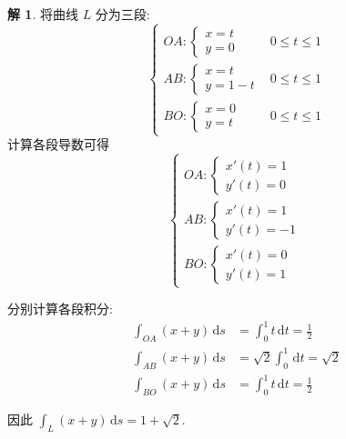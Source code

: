 \documentclass[a4paper,12pt]{article}
\theoremstyle{definition}
\newtheorem*{sol}{解}
\begin{document}
\begin{sol}
    将曲线 $L$ 分为三段:
    $$
        \begin{cases}
            OA: \begin{cases}
                    x = t \\
                    y = 0
                \end{cases} & 0 \leq t \leq 1 \\[8pt]
            AB: \begin{cases}
                    x = t \\
                    y = 1 - t
                \end{cases} & 0 \leq t \leq 1 \\[8pt]
            BO: \begin{cases}
                    x = 0 \\
                    y = t
                \end{cases} & 0 \leq t \leq 1
        \end{cases}
    $$
    计算各段导数可得
    $$
        \begin{cases}
            OA: \begin{cases}
                    x'(t) = 1 \\
                    y'(t) = 0
                \end{cases} \\[8pt]
            AB: \begin{cases}
                    x'(t) = 1 \\
                    y'(t) = -1
                \end{cases} \\[8pt]
            BO: \begin{cases}
                    x'(t) = 0 \\
                    y'(t) = 1
                \end{cases}
        \end{cases}
    $$

    分别计算各段积分:
    \begin{align*}
        \int_{OA} (x + y) \, \mathrm{d}s & = \int_0^1 t \, \mathrm{d}t       = \frac{1}{2} \\
        \int_{AB} (x + y) \, \mathrm{d}s & = \sqrt{2} \int_0^1 \, \mathrm{d}t = \sqrt{2}   \\
        \int_{BO} (x + y) \, \mathrm{d}s & = \int_0^1 t \, \mathrm{d}t       = \frac{1}{2}
    \end{align*}

    因此 $\int_L (x + y) \, \mathrm{d}s = 1 + \sqrt{2}$.
\end{sol}
\end{document}
